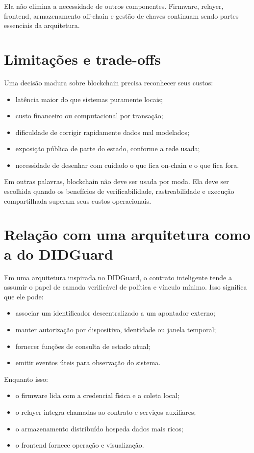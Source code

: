 Ela não elimina a necessidade de outros componentes. Firmware, relayer, frontend, armazenamento off-chain e gestão de chaves continuam sendo partes essenciais da arquitetura.

\section{Limitações e trade-offs}
Uma decisão madura sobre blockchain precisa reconhecer seus custos:
\begin{itemize}[leftmargin=*]
  \item latência maior do que sistemas puramente locais;
  \item custo financeiro ou computacional por transação;
  \item dificuldade de corrigir rapidamente dados mal modelados;
  \item exposição pública de parte do estado, conforme a rede usada;
  \item necessidade de desenhar com cuidado o que fica on-chain e o que fica fora.
\end{itemize}

Em outras palavras, blockchain não deve ser usada por moda. Ela deve ser escolhida quando os benefícios de verificabilidade, rastreabilidade e execução compartilhada superam seus custos operacionais.

\section{Relação com uma arquitetura como a do DIDGuard}
Em uma arquitetura inspirada no DIDGuard, o contrato inteligente tende a assumir o papel de camada verificável de política e vínculo mínimo. Isso significa que ele pode:
\begin{itemize}[leftmargin=*]
  \item associar um identificador descentralizado a um apontador externo;
  \item manter autorização por dispositivo, identidade ou janela temporal;
  \item fornecer funções de consulta de estado atual;
  \item emitir eventos úteis para observação do sistema.
\end{itemize}

Enquanto isso:
\begin{itemize}[leftmargin=*]
  \item o firmware lida com a credencial física e a coleta local;
  \item o relayer integra chamadas ao contrato e serviços auxiliares;
  \item o armazenamento distribuído hospeda dados mais ricos;
  \item o frontend fornece operação e visualização.
\end{itemize}

